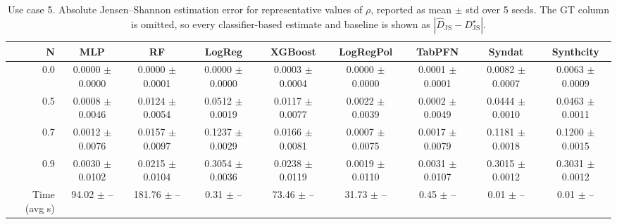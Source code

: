 \begin{table}[ht]
\centering
\small
\setlength{\tabcolsep}{3pt}
\caption{Use case 5. Absolute Jensen--Shannon estimation error for representative values of $\rho$, reported as mean $\pm$ std over 5 seeds. The GT column is omitted, so every classifier-based estimate and baseline is shown as $|\widehat{D}_{\mathrm{JS}} - D_{\mathrm{JS}}^{\star}|$.}
\label{tab:uc5_abs_error_no_gt_mean_std}
\begin{tabular}{rcccccccc}
\toprule
N & MLP & RF & LogReg & XGBoost & LogRegPol & TabPFN & Syndat & Synthcity \\
\midrule
0.0 & 0.0000 $\pm$ 0.0000 & 0.0000 $\pm$ 0.0001 & 0.0000 $\pm$ 0.0000 & 0.0003 $\pm$ 0.0004 & 0.0000 $\pm$ 0.0000 & 0.0001 $\pm$ 0.0001 & 0.0082 $\pm$ 0.0007 & 0.0063 $\pm$ 0.0009 \\
0.5 & 0.0008 $\pm$ 0.0046 & 0.0124 $\pm$ 0.0054 & 0.0512 $\pm$ 0.0019 & 0.0117 $\pm$ 0.0077 & 0.0022 $\pm$ 0.0039 & 0.0002 $\pm$ 0.0049 & 0.0444 $\pm$ 0.0010 & 0.0463 $\pm$ 0.0011 \\
0.7 & 0.0012 $\pm$ 0.0076 & 0.0157 $\pm$ 0.0097 & 0.1237 $\pm$ 0.0029 & 0.0166 $\pm$ 0.0081 & 0.0007 $\pm$ 0.0075 & 0.0017 $\pm$ 0.0079 & 0.1181 $\pm$ 0.0018 & 0.1200 $\pm$ 0.0015 \\
0.9 & 0.0030 $\pm$ 0.0102 & 0.0215 $\pm$ 0.0104 & 0.3054 $\pm$ 0.0036 & 0.0238 $\pm$ 0.0119 & 0.0019 $\pm$ 0.0110 & 0.0031 $\pm$ 0.0107 & 0.3015 $\pm$ 0.0012 & 0.3031 $\pm$ 0.0012 \\
Time (avg s) & 94.02 $\pm$ -- & 181.76 $\pm$ -- & 0.31 $\pm$ -- & 73.46 $\pm$ -- & 31.73 $\pm$ -- & 0.45 $\pm$ -- & 0.01 $\pm$ -- & 0.01 $\pm$ -- \\
\bottomrule
\end{tabular}
\end{table}